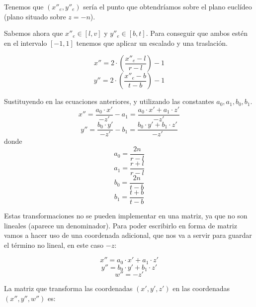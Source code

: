 \documentclass[a4paper,11pt, oneside]{book}
\begin{document}
Tenemos que $(x''_e,y''_e)$ sería el punto que obtendríamos sobre el plano euclídeo (plano situado sobre $z=-n$).

Sabemos ahora que $x''_e \in [l,v]$ y $y''_e \in [b,t]$. Para conseguir que ambos estén en el intervalo $[-1,1]$ tenemos que aplicar un escalado y una traslación. 

\begin{equation}
x'' = 2\cdot(\frac{x''_e-l}{r-l})-1
\end{equation}
\begin{equation}
y'' = 2\cdot(\frac{x''_e-b}{t-b})-1
\end{equation}

Sustituyendo en las ecuaciones anteriores, y utilizando las constantes $a_0,a_1, b_0, b_1$.
\begin{equation}
x'' = \frac{a_0 \cdot x'}{-z'} -a_1 = \frac{a_0 \cdot x'+a_1 \cdot z'}{-z'}
\end{equation}
\begin{equation}
y'' = \frac{b_0 \cdot y'}{-z'} -b_1 = \frac{b_0 \cdot y'+b_1 \cdot z'}{-z'}
\end{equation}
donde
\begin{equation}
a_0 = \frac{2n}{r-l}
\end{equation}
\begin{equation}
a_1 = \frac{r+l}{r-l}
\end{equation}
\begin{equation}
b_0 = \frac{2n}{t-b}
\end{equation}
\begin{equation}
b_1 = \frac{t+b}{t-b}
\end{equation}

Estas transformaciones no se pueden implementar en una matriz, ya que no son lineales (aparece un denominador). Para poder escribirlo en forma de matriz vamos a hacer uso de una coordenada adicional, que nos va a servir para guardar el término no lineal, en este caso $-z$:

\begin{equation}
x'' = a_0 \cdot x'+a_1 \cdot z'
\end{equation}
\begin{equation}
y'' = b_0 \cdot y'+b_1 \cdot z'
\end{equation}
\begin{equation}
w'' = -z'
\end{equation}

La matriz que transforma las coordenadas $(x',y',z')$ en las coordenadas $(x'',y'',w'')$ es:
\end{document}
